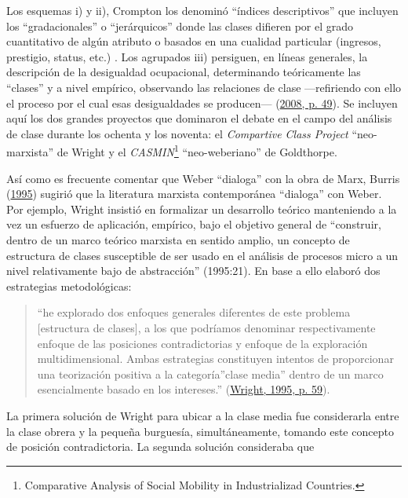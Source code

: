 \documentclass[
]{article}
\begin{document}
Los esquemas i) y ii), Crompton los denominó ``índices descriptivos'' que incluyen los ``gradacionales'' o ``jerárquicos'' donde las clases difieren por el grado cuantitativo de algún atributo o basados en una cualidad particular (ingresos, prestigio, status, etc.) . Los agrupados iii) persiguen, en líneas generales, la descripción de la desigualdad ocupacional, determinando teóricamente las ``clases'' y a nivel empírico, observando las relaciones de clase ---refiriendo con ello el proceso por el cual esas desigualdades se producen--- (\protect\hyperlink{ref-Crompton2008}{2008, p. 49}). Se incluyen aquí los dos grandes proyectos que dominaron el debate en el campo del análisis de clase durante los ochenta y los noventa: el \emph{Compartive Class Project} ``neo-marxista'' de Wright y el \emph{CASMIN}\footnote{Comparative Analysis of Social Mobility in Industrializad Countries.} ``neo-weberiano'' de Goldthorpe.

Así como es frecuente comentar que Weber ``dialoga'' con la obra de Marx, Burris (\protect\hyperlink{ref-Burris1995}{1995}) sugirió que la literatura marxista contemporánea ``dialoga'' con Weber. Por ejemplo, Wright insistió en formalizar un desarrollo teórico manteniendo a la vez un esfuerzo de aplicación, empírico, bajo el objetivo general de ``construir, dentro de un marco teórico marxista en sentido amplio, un concepto de estructura de clases susceptible de ser usado en el análisis de procesos micro a un nivel relativamente bajo de abstracción'' (1995:21). En base a ello elaboró dos estrategias metodológicas:

\begin{quote}
``he explorado dos enfoques generales diferentes de este problema {[}estructura de clases{]}, a los que podríamos denominar respectivamente enfoque de las posiciones contradictorias y enfoque de la exploración multidimensional. Ambas estrategias constituyen intentos de proporcionar una teorización positiva a la categoría''clase media'' dentro de un marco esencialmente basado en los intereses.'' (\protect\hyperlink{ref-Wright1995a}{Wright, 1995, p. 59}).
\end{quote}

La primera solución de Wright para ubicar a la clase media fue considerarla entre la clase obrera y la pequeña burguesía, simultáneamente, tomando este concepto de posición contradictoria. La segunda solución consideraba que
\end{document}
